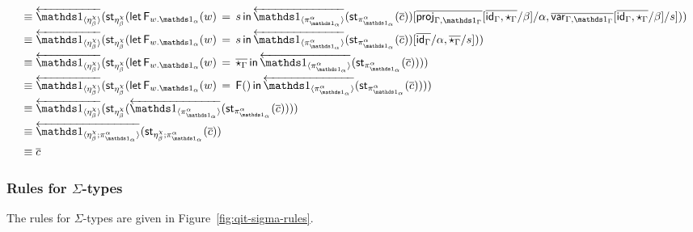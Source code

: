 \documentclass[10pt]{article}
\theoremstyle{definition}
\newcommand{\id}{\mathsf{id}}
\newcommand{\rewrite}[2]{\overleftarrow{#1}(#2)}
\newcommand\StI[2]{\ensuremath{\mathsf{st}_{#1}(#2)}}
\newcommand\FEs[4]{\ensuremath{\mathsf{let} \, \mathsf{F}_{#1}(#3) \, = \, {#2} \, \mathsf{in} \, #4}}
\newcommand\FI[1]{\ensuremath{\mathsf{F}{(#1)}}}
\begin{document}
\begin{enumerate}[style = multiline, labelwidth = 80pt]
\begin{align*}
&\equiv \rewrite{\ApOne{\eta^\chi_\beta}}{\StI{\eta^\chi_\beta}{\FEs{w.\One_\alpha}{s}{w}{\rewrite{\ApOne{\pi^\alpha_{\One_\alpha}}}{\StI{\pi^\alpha_{\One_\alpha}}{\upstairs{c}}}}[\upstairs{\proj{\Gamma, \One_\Gamma}}[\upstairs{\id_\Gamma, \star_\Gamma}/\beta]/\alpha, \upstairs{\qvar{\Gamma, \One_\Gamma}}[\upstairs{\id_\Gamma, \star_\Gamma}/\beta]/s]}} \\
&\equiv \rewrite{\ApOne{\eta^\chi_\beta}}{\StI{\eta^\chi_\beta}{\FEs{w.\One_\alpha}{s}{w}{\rewrite{\ApOne{\pi^\alpha_{\One_\alpha}}}{\StI{\pi^\alpha_{\One_\alpha}}{\upstairs{c}}}}[\upstairs{\id_\Gamma}/\alpha, \upstairs{\star_\Gamma}/s]}} \\
&\equiv \rewrite{\ApOne{\eta^\chi_\beta}}{\StI{\eta^\chi_\beta}{\FEs{w.\One_\alpha}{\upstairs{\star_\Gamma}}{w}{\rewrite{\ApOne{\pi^\alpha_{\One_\alpha}}}{\StI{\pi^\alpha_{\One_\alpha}}{\upstairs{c}}}}}} \\
&\equiv \rewrite{\ApOne{\eta^\chi_\beta}}{\StI{\eta^\chi_\beta}{\FEs{w.\One_\alpha}{\FI{}}{w}{\rewrite{\ApOne{\pi^\alpha_{\One_\alpha}}}{\StI{\pi^\alpha_{\One_\alpha}}{\upstairs{c}}}}}} \\
&\equiv \rewrite{\ApOne{\eta^\chi_\beta}}{\StI{\eta^\chi_\beta}{\rewrite{\ApOne{\pi^\alpha_{\One_\alpha}}}{\StI{\pi^\alpha_{\One_\alpha}}{\upstairs{c}}}}} \\
&\equiv \rewrite{\ApOne{\eta^\chi_\beta;\pi^\alpha_{\One_\alpha}}}{\StI{\eta^\chi_\beta;\pi^\alpha_{\One_\alpha}}{\upstairs{c}}} \\
&\equiv \upstairs{c}
\end{align*}
\end{enumerate}

\subsubsection{Rules for $\Sigma$-types}
\newcommand\qpair[1]{\ensuremath{\mathsf{pair}_{#1}}}
\newcommand\qsplit[1]{\ensuremath{\mathsf{split}_{#1}}}

The rules for $\Sigma$-types are given in Figure~\ref{fig:qit-sigma-rules}. 

\end{document}
